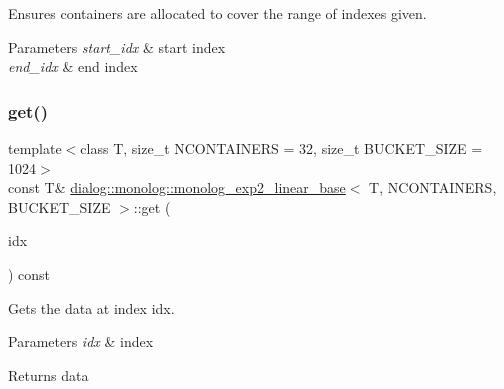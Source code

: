 Ensures containers are allocated to cover the range of indexes given. 
\begin{DoxyParams}{Parameters}
{\em start\+\_\+idx} & start index \\
\hline
{\em end\+\_\+idx} & end index \\
\hline
\end{DoxyParams}
\mbox{\label{classdialog_1_1monolog_1_1monolog__exp2__linear__base_abe94ca8684b2554afe1e1a48b65aab59}} 
\subsubsection{\texorpdfstring{get()}{get()}\hspace{0.1cm}{\footnotesize\ttfamily [1/2]}}
{\footnotesize\ttfamily template$<$class T, size\+\_\+t N\+C\+O\+N\+T\+A\+I\+N\+E\+RS = 32, size\+\_\+t B\+U\+C\+K\+E\+T\+\_\+\+S\+I\+ZE = 1024$>$ \\
const T\& \hyperlink{classdialog_1_1monolog_1_1monolog__exp2__linear__base}{dialog\+::monolog\+::monolog\+\_\+exp2\+\_\+linear\+\_\+base}$<$ T, N\+C\+O\+N\+T\+A\+I\+N\+E\+RS, B\+U\+C\+K\+E\+T\+\_\+\+S\+I\+ZE $>$\+::get (\begin{DoxyParamCaption}\item[{size\+\_\+t}]{idx }\end{DoxyParamCaption}) const\hspace{0.3cm}{\ttfamily [inline]}}

Gets the data at index idx. 
\begin{DoxyParams}{Parameters}
{\em idx} & index \\
\hline
\end{DoxyParams}
\begin{DoxyReturn}{Returns}
data 
\end{DoxyReturn}
\mbox{\label{classdialog_1_1monolog_1_1monolog__exp2__linear__base_aaf8379e07ff6a87efea96f603b7b38f9}} 
